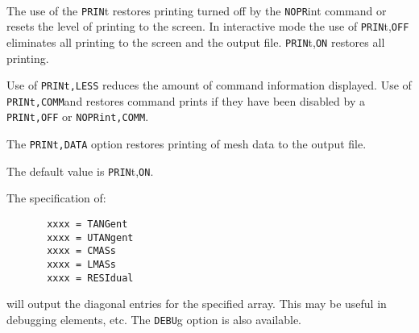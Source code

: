  \\{\smallskip}
 \\{\smallskip}
 \\{\smallskip}
 \\{\smallskip}
 \\{\smallskip}
 \\{\smallskip}
\headb

The use of the {\tt PRIN}t restores printing turned off by
the {\tt NOPR}int command or resets the level of printing to the screen.  
In interactive mode the use of {\tt PRIN}t,{\tt OFF} eliminates all printing
to the screen and the output file.
{\tt PRIN}t,{\tt ON} restores all printing.

Use of {\tt PRINt,LESS} reduces the amount of command information displayed.
Use of {\tt PRINt,COMM}and restores command prints if they have been
disabled by a {\tt PRINt,OFF} or {\tt NOPRint,COMM}.

The {\tt PRINt,DATA} option restores printing of mesh data to the output
file.

The default value is {\tt PRIN}t,{\tt ON}.

The specification of:
\begin{verbatim}
       xxxx = TANGent
       xxxx = UTANgent
       xxxx = CMASs
       xxxx = LMASs
       xxxx = RESIdual
\end{verbatim}
\par\noindent
will output the diagonal entries for the specified array.
This may be useful in debugging elements, etc.  The {\tt DEBU}g
option is also available.
\vfill\eject
